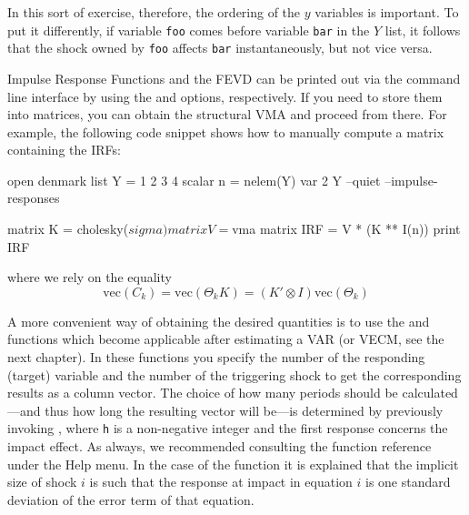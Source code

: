 In this sort of exercise, therefore, the ordering of the $y$ variables
is important.
To put it
differently, if variable \texttt{foo} comes before variable
\texttt{bar} in the $Y$ list, it follows that the shock owned by
\texttt{foo} affects \texttt{bar} instantaneously, but not
vice versa.

Impulse Response Functions and the FEVD can be printed out via the
command line interface by using the  and
 options, respectively. If you need to store
them into matrices, you can obtain the structural VMA and proceed
from there. For example, the following code snippet shows how to
manually compute a matrix containing the IRFs:
\begin{code}
open denmark
list Y = 1 2 3 4
scalar n = nelem(Y)
var 2 Y --quiet --impulse-responses

matrix K = cholesky($sigma)
matrix V = $vma
matrix IRF = V * (K ** I(n))
print IRF
\end{code}
where we rely on the equality
\[
\mathrm{vec}(C_k) = \mathrm{vec}(\Theta_k K) = (K' \otimes I)
\mathrm{vec} (\Theta_k)
\]

A more convenient way of obtaining the desired quantities is to use the
 and  functions which become applicable after
estimating a VAR (or VECM, see the next chapter). In these functions you
specify the number of the responding (target) variable and the number of
the triggering shock to get the corresponding results as a column
vector. The choice of how many periods should be calculated---and thus
how long the resulting vector will be---is determined by previously
invoking , where \texttt{h} is a non-negative integer
and the first response concerns the impact effect.  As always, we
recommended consulting the function reference under the \textsf{Help}
menu. In the case of the  function it is explained that the
implicit size of shock $i$ is such that the response at impact in
equation $i$ is one standard deviation of the error term of that
equation.

